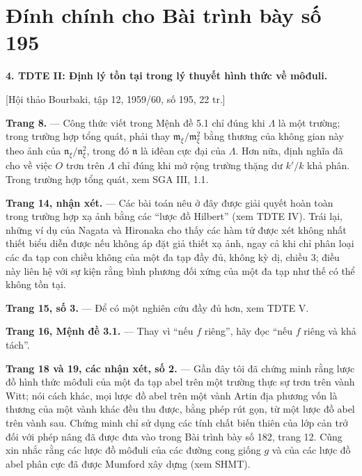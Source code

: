 \clearpage
\chapter*{Đính chính cho Bài trình bày số 195}
\setcounter{footnote}{0}

\noindent\textbf{4. TDTE II: Định lý tồn tại trong lý thuyết hình thức về
môđuli.}

\begin{center}
[Hội thảo Bourbaki, tập 12, 1959/60, số 195, 22 tr.]
\end{center}

\noindent\textbf{Trang 8.} --- Công thức viết trong Mệnh đề 5.1 chỉ đúng khi
$\Lambda$ là một trường; trong trường hợp tổng quát, phải thay
$\mathfrak m_\xi/\mathfrak m_\xi^2$ bằng thương của không gian này theo ảnh
của $\mathfrak n_\xi/\mathfrak n_\xi^2$, trong đó $\mathfrak n$ là iđêan cực
đại của $\Lambda$. Hơn nữa, định nghĩa đã cho về việc $O$ trơn trên
$\Lambda$ chỉ đúng khi mở rộng trường thặng dư $k'/k$ khả phân. Trong trường
hợp tổng quát, xem SGA III, 1.1.

\noindent\textbf{Trang 14, nhận xét.} --- Các bài toán nêu ở đây được giải
quyết hoàn toàn trong trường hợp xạ ảnh bằng các ``lược đồ Hilbert'' (xem
TDTE IV). Trái lại, những ví dụ của Nagata và Hironaka cho thấy các hàm tử
được xét không nhất thiết biểu diễn được nếu không áp đặt giả thiết xạ ảnh,
ngay cả khi chỉ phân loại các đa tạp con chiều không của một đa tạp đầy đủ,
không kỳ dị, chiều 3; điều này liên hệ với sự kiện rằng bình phương đối xứng
của một đa tạp như thế có thể không tồn tại.

\noindent\textbf{Trang 15, số 3.} --- Để có một nghiên cứu đầy đủ hơn, xem
TDTE V.

\noindent\textbf{Trang 16, Mệnh đề 3.1.} --- Thay vì ``nếu $f$ riêng'',
hãy đọc ``nếu $f$ riêng và khả tách''.

\noindent\textbf{Trang 18 và 19, các nhận xét, số 2.} --- Gần đây tôi đã
chứng minh rằng lược đồ hình thức môđuli của một đa tạp abel trên một trường
thực sự trơn trên vành Witt; nói cách khác, mọi lược đồ abel trên một vành
Artin địa phương vốn là thương của một vành khác đều thu được, bằng phép rút
gọn, từ một lược đồ abel trên vành sau. Chứng minh chỉ sử dụng các tính chất
biến thiên của lớp cản trở đối với phép nâng đã được đưa vào trong Bài trình
bày số 182, trang 12. Cũng xin nhắc rằng các lược đồ môđuli của các đường cong
giống $g$ và của các lược đồ abel phân cực đã được Mumford xây dựng (xem
SHMT).

